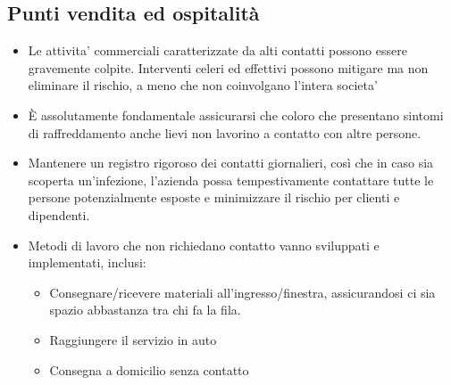 \documentclass[onecolumn,journal]{IEEEtran}
\begin{document}
\begin{multicols}{2}
\section*{Punti vendita ed ospitalità}
\begin{itemize}
\item Le attivita’ commerciali caratterizzate da alti contatti possono essere gravemente colpite. Interventi celeri ed effettivi possono mitigare ma non eliminare il rischio, a meno che non coinvolgano l’intera societa’
\item È assolutamente fondamentale assicurarsi che coloro che presentano sintomi di raffreddamento anche lievi non lavorino a contatto con altre persone.
\item Mantenere un registro rigoroso dei contatti giornalieri, così che in caso sia scoperta un'infezione, l'azienda possa tempestivamente contattare tutte le persone potenzialmente esposte e minimizzare il rischio per clienti e dipendenti.
\item Metodi di lavoro che non richiedano contatto vanno sviluppati e implementati, inclusi:
  \begin{itemize}
    \item Consegnare/ricevere materiali all’ingresso/finestra, assicurandosi ci sia spazio abbastanza tra chi fa la fila.
    \item Raggiungere il servizio in auto
    \item Consegna a domicilio senza contatto
  \end{itemize}
\end{itemize}


\end{multicols}

\vspace{2ex}







% 

\end{document}
